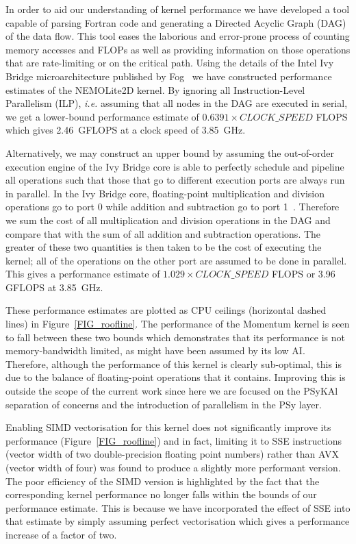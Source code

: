 \documentclass[gmd, manuscript]{copernicus}
\begin{document}
In order to aid our understanding of kernel performance we have
developed a tool capable of parsing Fortran code and generating a
Directed Acyclic Graph (DAG) of the data flow. This tool eases the
laborious and error-prone process of counting memory accesses and
FLOPs as well as providing information on those operations that are
rate-limiting or on the critical path. Using the details of the Intel
Ivy Bridge microarchitecture published by Fog~\citep{fog_microarch,
  fog_instructions} we have constructed performance estimates of the
NEMOLite2D kernel. By ignoring all Instruction-Level Parallelism
(ILP), \textit{i.e.} assuming that all nodes in the DAG are executed
in serial, we get a lower-bound performance estimate of $0.6391 \times
CLOCK\_SPEED$ FLOPS which gives 2.46~GFLOPS at a clock speed of
3.85~GHz.

Alternatively, we may construct an upper bound by assuming the
out-of-order execution engine of the Ivy Bridge core is able to
perfectly schedule and pipeline all operations such that those that go
to different execution ports are always run in parallel. In the Ivy
Bridge core, floating-point multiplication and division operations go
to port 0 while addition and subtraction go to port
1~\citep{fog_instructions}. Therefore we sum the cost of all
multiplication and division operations in the DAG and compare that
with the sum of all addition and subtraction operations. The greater
of these two quantities is then taken to be the cost of executing the
kernel; all of the operations on the other port are assumed to be done
in parallel. This gives a performance estimate of $1.029 \times
CLOCK\_SPEED$ FLOPS or 3.96 GFLOPS at 3.85~GHz.

These performance estimates are plotted as CPU ceilings (horizontal
dashed lines) in Figure~\ref{FIG_roofline}. The performance of the
Momentum kernel is seen to fall between these two bounds which
demonstrates that its performance is not memory-bandwidth limited, as
might have been assumed by its low AI. Therefore, although the
performance of this kernel is clearly sub-optimal, this is due to the
balance of floating-point operations that it contains. Improving this
is outside the scope of the current work since here we are focused on
the {PS}y{KA}l separation of concerns and the introduction of parallelism
in the PSy layer.

Enabling SIMD vectorisation for this kernel does not significantly
improve its performance (Figure~\ref{FIG_roofline}) and in fact,
limiting it to SSE instructions (vector width of two double-precision
floating point numbers) rather than AVX (vector width of four) was
found to produce a slightly more performant version. The poor
efficiency of the SIMD version is highlighted by the fact that the
corresponding kernel performance no longer falls within the bounds of
our performance estimate. This is because we have incorporated the
effect of SSE into that estimate by simply assuming perfect
vectorisation which gives a performance increase of a factor of two.
\end{document}
